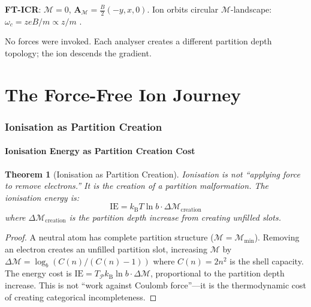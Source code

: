 \documentclass[11pt,twocolumn,a4paper]{article}
\newtheorem{theorem}{Theorem}[section]
\theoremstyle{definition}
\theoremstyle{remark}
\newcommand{\kB}{k_{\mathrm{B}}}
\newcommand{\Depth}{\mathcal{M}}
\newcommand{\Apartition}{\mathbf{A}_{\mathcal{M}}}
\begin{document}
\textbf{FT-ICR}: $\Depth = 0$, $\Apartition = \frac{B}{2}(-y,x,0)$. Ion orbits circular $\Depth$-landscape: $\omega_c = zeB/m \propto z/m$ \citep{marshall1998}.

No forces were invoked. Each analyser creates a different partition depth topology; the ion descends the gradient.


\part{The Force-Free Ion Journey}

\section{Ionisation as Partition Creation}
\label{sec:ionisation}

\subsection{Ionisation Energy as Partition Creation Cost}

\begin{theorem}[Ionisation as Partition Creation]
\label{thm:ionisation}
Ionisation is not ``applying force to remove electrons.'' It is the creation of a partition malformation. The ionisation energy is:
\begin{equation}
\mathrm{IE} = \kB T \ln b \cdot \Delta\Depth_{\mathrm{creation}}
\end{equation}
where $\Delta\Depth_{\mathrm{creation}}$ is the partition depth increase from creating unfilled slots.
\end{theorem}

\begin{proof}
A neutral atom has complete partition structure ($\Depth = \Depth_{\min}$). Removing an electron creates an unfilled partition slot, increasing $\Depth$ by $\Delta\Depth = \log_b(C(n)/(C(n)-1))$ where $C(n) = 2n^2$ is the shell capacity. The energy cost is $\mathrm{IE} = T_{\mathcal{P}}\kB\ln b \cdot \Delta\Depth$, proportional to the partition depth increase. This is not ``work against Coulomb force''---it is the thermodynamic cost of creating categorical incompleteness.
\end{proof}
\end{document}
